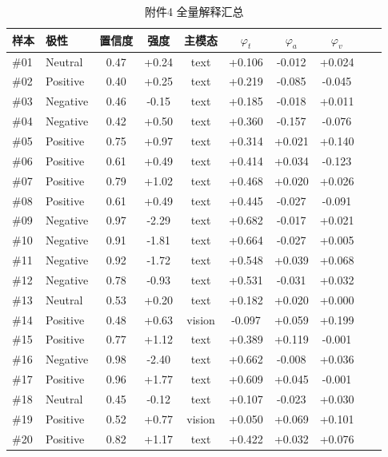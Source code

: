 \begin{table}[htbp]
  \centering
  \caption{附件4 全量解释汇总}
  \label{tab:p3-att4}
  \small
  \begin{tabularx}{\textwidth}{@{}llcccccccc@{}}
    \toprule
    样本 & 极性 & 置信度 & 强度 & 主模态 & $\varphi_t$ & $\varphi_a$ & $\varphi_v$ \\
    \midrule
    \#01 & Neutral & 0.47 & +0.24 & text & +0.106 & -0.012 & +0.024 \\
    \#02 & Positive & 0.40 & +0.25 & text & +0.219 & -0.085 & -0.045 \\
    \#03 & Negative & 0.46 & -0.15 & text & +0.185 & -0.018 & +0.011 \\
    \#04 & Negative & 0.42 & +0.50 & text & +0.360 & -0.157 & -0.076 \\
    \#05 & Positive & 0.75 & +0.97 & text & +0.314 & +0.021 & +0.140 \\
    \#06 & Positive & 0.61 & +0.49 & text & +0.414 & +0.034 & -0.123 \\
    \#07 & Positive & 0.79 & +1.02 & text & +0.468 & +0.020 & +0.026 \\
    \#08 & Positive & 0.61 & +0.49 & text & +0.445 & -0.027 & -0.091 \\
    \#09 & Negative & 0.97 & -2.29 & text & +0.682 & -0.017 & +0.021 \\
    \#10 & Negative & 0.91 & -1.81 & text & +0.664 & -0.027 & +0.005 \\
    \#11 & Negative & 0.92 & -1.72 & text & +0.548 & +0.039 & +0.068 \\
    \#12 & Negative & 0.78 & -0.93 & text & +0.531 & -0.031 & +0.032 \\
    \#13 & Neutral & 0.53 & +0.20 & text & +0.182 & +0.020 & +0.000 \\
    \#14 & Positive & 0.48 & +0.63 & vision & -0.097 & +0.059 & +0.199 \\
    \#15 & Positive & 0.77 & +1.12 & text & +0.389 & +0.119 & -0.001 \\
    \#16 & Negative & 0.98 & -2.40 & text & +0.662 & -0.008 & +0.036 \\
    \#17 & Positive & 0.96 & +1.77 & text & +0.609 & +0.045 & -0.001 \\
    \#18 & Neutral & 0.45 & -0.12 & text & +0.107 & -0.023 & +0.030 \\
    \#19 & Positive & 0.52 & +0.77 & vision & +0.050 & +0.069 & +0.101 \\
    \#20 & Positive & 0.82 & +1.17 & text & +0.422 & +0.032 & +0.076 \\
    \bottomrule
  \end{tabularx}
\end{table}
